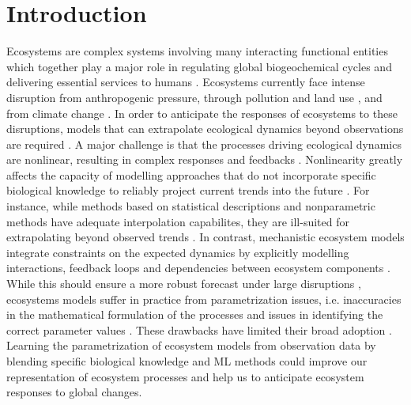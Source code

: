 \section{Introduction}

Ecosystems are complex systems involving many interacting functional entities which together play a major role in regulating global biogeochemical cycles \citep{Bonan2008} and delivering essential services to humans \citep{Kremen2005}.
%
Ecosystems currently face intense disruption from anthropogenic pressure, through pollution and land use \citep{Doney2010,Ellis2011}, and from climate change \citep{Midgley2019}. In order to anticipate the responses of ecosystems to these disruptions, models that can extrapolate ecological dynamics beyond observations are required \citep{Boyd2012}. 
%
A major challenge is that the processes driving ecological dynamics are nonlinear, resulting in complex responses and feedbacks \citep{Scheffer2001}. Nonlinearity greatly affects the capacity of modelling approaches that do not incorporate specific biological knowledge to reliably project current trends into the future \citep{Barnosky2012}. For instance, while methods based on statistical descriptions \citep{Deneu2021} and nonparametric methods \citep{Ye2015,Ye2016,Deyle2016} have adequate interpolation capabilites, they are ill-suited for extrapolating beyond observed trends \citep{Barnosky2012,Urban2016}.
%
In contrast, mechanistic ecosystem models integrate constraints on the expected dynamics by explicitly modelling interactions, feedback loops and dependencies between ecosystem components \citep{Geary2020}. While this should ensure a more robust forecast under large disruptions \citep{Norberg2012}, ecosystems models suffer in practice from parametrization issues, i.e. inaccuracies in the mathematical formulation of the processes and issues in identifying the correct parameter values \citep{DeAngelis2015}. These drawbacks have limited their broad adoption \citep{Urban2016}.
%
Learning the parametrization of ecosystem models from observation data by blending specific biological knowledge and ML methods could improve our representation of ecosystem processes and help us to anticipate ecosystem responses to global changes.

